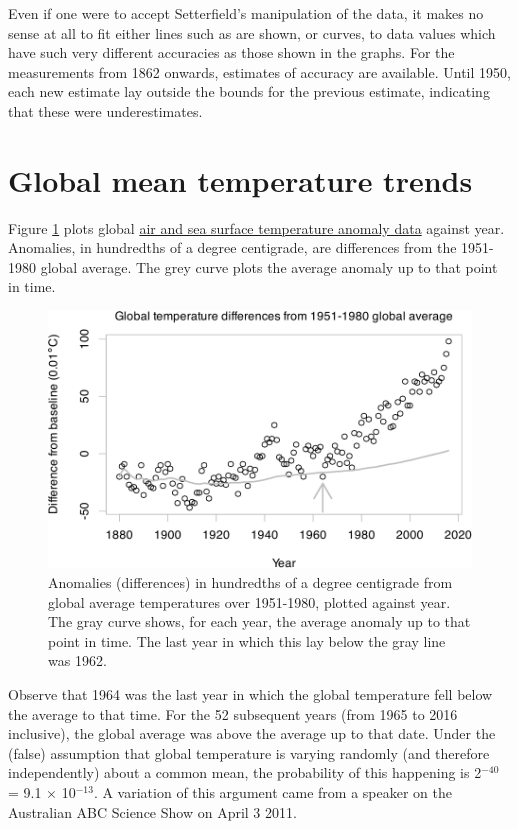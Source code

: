 \documentclass[
  10pt,
  b5paper]{book}
\begin{document}
Even if one were to accept Setterfield's manipulation of the data,
it makes no sense at all to fit either lines such as are shown, or
curves, to data values which have such very different
accuracies as those shown in the graphs. For the
measurements from 1862 onwards, estimates of accuracy are
available. Until 1950, each new estimate lay outside the
bounds for the previous estimate, indicating that these
were underestimates.

\hypertarget{global-mean-temperature-trends}{%
\section{Global mean temperature trends}\label{global-mean-temperature-trends}}

Figure \ref{fig:climate} plots global
\href{http://iridl.ldeo.columbia.edu/SOURCES/.NASA/.GISS/.GISSTEMP/.Global/.LOTI/}{air and sea surface temperature anomaly data}
against year. Anomalies, in hundredths of a degree centigrade, are
differences from the 1951-1980 global average. The grey curve plots
the average anomaly up to that point in time.

\begin{figure}[H]

{\centering \includegraphics[width=0.8\linewidth]{08-observational_files/figure-latex/climate-1} 

}

\caption{Anomalies (differences) in hundredths of a degree centigrade
from global average temperatures over 1951-1980, plotted against year.
The gray curve shows, for each year, the average anomaly up to that
point in time.  The last year in which this lay below the gray line
was 1962.}\label{fig:climate}
\end{figure}

Observe that 1964 was the last year in which the global
temperature fell below the average to that time.
For the 52 subsequent years (from 1965 to 2016 inclusive),
the global average was above the average up to that date. Under
the (false) assumption that global temperature is varying
randomly (and therefore independently) about a common mean,
the probability of this happening is 2\(^{-40}\) = 9.1
\(\times\) 10\(^{-13}\). A variation of this argument came
from a speaker on the Australian ABC Science Show on April
3 2011.
\end{document}
